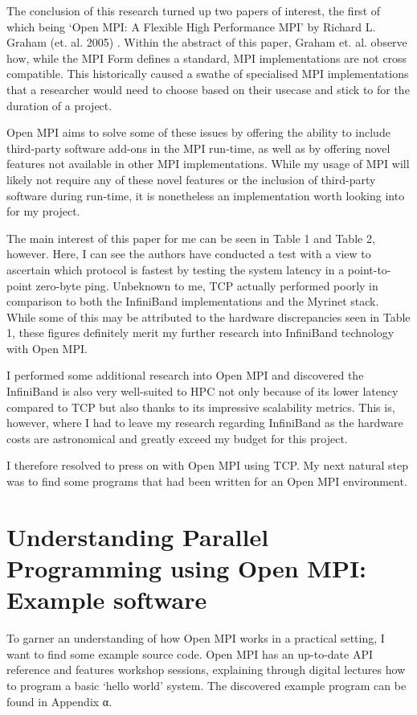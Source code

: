 The conclusion of this research turned up two papers of interest, the first of which being `Open MPI: A Flexible High Performance MPI' by Richard L. Graham (et. al. 2005) \cite{graham_et_al_2006}. Within the abstract of this paper, Graham et. al. observe how, while the MPI Form defines a standard, MPI implementations are not cross compatible. This historically caused a swathe of specialised MPI implementations that a researcher would need to choose based on their usecase and stick to for the duration of a project.

Open MPI aims to solve some of these issues by offering the ability to include third-party software add-ons in the MPI run-time, as well as by offering novel features not available in other MPI implementations. While my usage of MPI will likely not require any of these novel features or the inclusion of third-party software during run-time, it is nonetheless an implementation worth looking into for my project.

The main interest of this paper for me can be seen in Table 1 and Table 2, however. Here, I can see the authors have conducted a test with a view to ascertain which protocol is fastest by testing the system latency in a point-to-point zero-byte ping. Unbeknown to me, TCP actually performed poorly in comparison to both the InfiniBand implementations and the Myrinet stack. While some of this may be attributed to the hardware discrepancies seen in Table 1, these figures definitely merit my further research into InfiniBand technology with Open MPI.

I performed some additional research into Open MPI \cite{shipman_et_al_2006} and discovered the InfiniBand is also very well-suited to HPC not only because of its lower latency compared to TCP but also thanks to its impressive scalability metrics. This is, however, where I had to leave my research regarding InfiniBand as the hardware costs are astronomical and greatly exceed my budget for this project.

I therefore resolved to press on with Open MPI using TCP. My next natural step was to find some programs that had been written for an Open MPI environment.

\section{Understanding Parallel Programming using Open MPI: Example software}
To garner an understanding of how Open MPI works in a practical setting, I want to find some example source code. Open MPI has an up-to-date API reference \cite{open_mpi_2020} and features workshop sessions, explaining through digital lectures how to program a basic `hello world' system. The discovered example program can be found in Appendix α.

